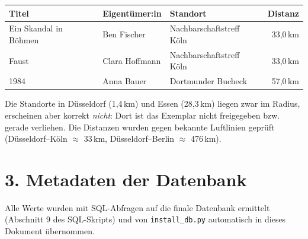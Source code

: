 \documentclass[11pt,a4paper]{article}
\begin{document}
\begin{center}\small
\begin{tabular}{@{}lllr@{}}
\toprule
\textbf{Titel} & \textbf{Eigentümer:in} & \textbf{Standort} & \textbf{Distanz} \\
\midrule
Ein Skandal in Böhmen & Ben Fischer & Nachbarschaftstreff Köln & 33,0\,km \\
Faust & Clara Hoffmann & Nachbarschaftstreff Köln & 33,0\,km \\
1984 & Anna Bauer & Dortmunder Bucheck & 57,0\,km \\
\bottomrule
\end{tabular}
\end{center}
Die Standorte in Düsseldorf (1,4\,km) und Essen (28,3\,km) liegen zwar im Radius, erscheinen aber korrekt \emph{nicht}: Dort ist das Exemplar nicht freigegeben bzw. gerade verliehen. Die Distanzen wurden gegen bekannte Luftlinien geprüft (Düsseldorf--Köln $\approx$ 33\,km, Düsseldorf--Berlin $\approx$ 476\,km).

\section*{3. Metadaten der Datenbank}
Alle Werte wurden mit SQL-Abfragen auf die finale Datenbank ermittelt (Abschnitt 9 des SQL-Skripts) und von \texttt{install\_db.py} automatisch in dieses Dokument übernommen.
\end{document}
